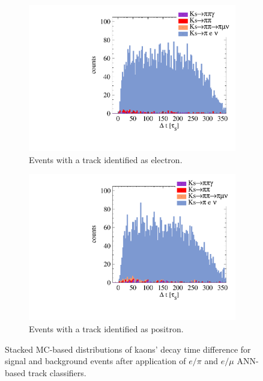 \begin{figure}[h!]
  \captionsetup[subfigure]{justification=centering}
  \centering
  \begin{subfigure}{0.45\textwidth}
  \includegraphics[width=1.0\textwidth]{Chapter7_analysis_kloe/img/csps/no_bcg_eminus}
  \caption{Events with a track identified as electron.}
  \end{subfigure}
  \begin{subfigure}{0.45\textwidth}
  \includegraphics[width=1.0\textwidth]{Chapter7_analysis_kloe/img/csps/no_bcg_eplus}
  \caption{Events with a track identified as positron.}
  \end{subfigure}
  \caption{Stacked MC-based distributions of kaons' decay time difference for signal and background events after application of $e/\pi$ and $e/\mu$ ANN-based track classifiers.}\label{fig:csps-dt-after}
\end{figure}


